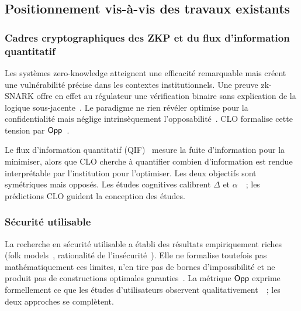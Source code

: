\subsection{Positionnement vis-\`a-vis des travaux existants}
\label{subsec:positionnement_travaux}
\begin{sloppypar}

\subsubsection{Cadres cryptographiques des ZKP et du flux d'information quantitatif}
\label{subsubsec:cadres_crypto_zkp}

Les syst\`emes zero-knowledge atteignent une efficacit\'e remarquable
mais cr\'eent une vuln\'erabilit\'e pr\'ecise dans les contextes
institutionnels. Une preuve zk-SNARK offre en effet au r\'egulateur une
v\'erification binaire sans explication de la logique
sous-jacente~\cite{Groth16,BCTV14,PLONK20}. Le paradigme
\og ne rien r\'ev\'eler \fg{} optimise pour la confidentialit\'e mais
n\'eglige intrins\`equement l'opposabilit\'e~\cite{Bonneau16,Grimmelmann15}.
CLO formalise cette tension par $\mathsf{Opp}$~\cite{MINKA2026CLO}.

Le flux d'information quantitatif (QIF)~\cite{Smith09,Alvim12,Clarkson05}
mesure la fuite d'information pour la minimiser, alors que CLO cherche \`a
quantifier combien d'information est rendue interpr\'etable par
l'institution pour l'optimiser. Les deux objectifs sont sym\'etriques mais
oppos\'es. Les \'etudes cognitives calibrent $\Delta$ et
$\alpha$~\cite{Miller56,Simon82,Kahneman11}~; les pr\'edictions CLO
guident la conception des \'etudes.

\subsubsection{S\'ecurit\'e utilisable}
\label{subsubsec:securite_utilisable}

La recherche en s\'ecurit\'e utilisable a \'etabli des r\'esultats
empiriquement riches (folk models~\cite{Wash2010}, rationalit\'e de
l'ins\'ecurit\'e~\cite{Herley09}). Elle ne formalise toutefois pas
math\'ematiquement ces limites, n'en tire pas de bornes d'impossibilit\'e
et ne produit pas de constructions optimales
garanties~\cite{Cranor05,Bonneau12}. La m\'etrique $\mathsf{Opp}$ exprime
formellement ce que les \'etudes d'utilisateurs observent
qualitativement~\cite{MINKA2026CLO}~; les deux approches se compl\`etent.


\end{sloppypar}
